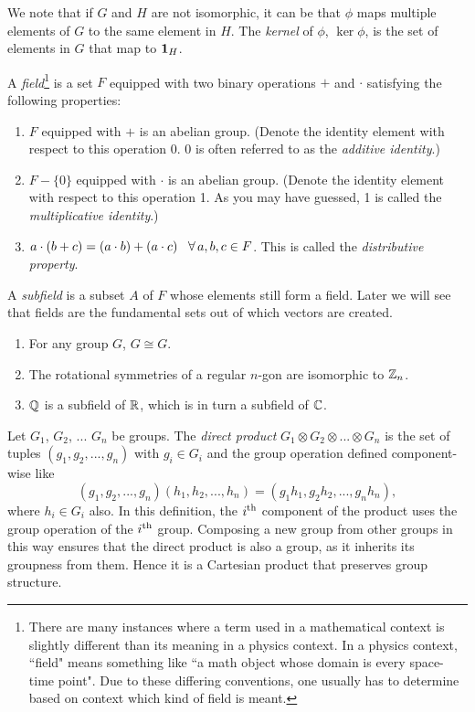 We note that if $G$ and $H$ are not isomorphic, it can be that $\phi$ maps
multiple elements of $G$ to the same element in $H$. The {\it
kernel} of $\phi$, $\ker\phi$, is the set of elements in $G$ that map
to ${\mathbf 1}_H$. 


A {\it field}\footnote{There are many instances where a term used in
a mathematical context is slightly different than its meaning in
a physics context. In a physics context, ``field" means something like
``a math object whose domain is every space-time point".
Due to these differing conventions, one usually has to determine based
on context which kind of field is meant.} 
is a set $F$ equipped with two binary
  operations  $+$ and $\cdot$  satisfying the following properties:
  \begin{enumerate}
    \item $F$ equipped with $+$ is an abelian group. (Denote the 
          identity element with respect to this operation 0. 0 is often 
          referred to as the {\it additive identity}.)
    \item $F-\{0\}$ equipped with $\cdot$ is an abelian group. (Denote the
          identity element with respect to this operation 1. As you may have
          guessed, 1 is called the 
          {\it multiplicative identity}.)
    \item $a\cdot (b+c)=(a\cdot b)+(a\cdot c)\ \ \Forall a,b,c\in F$. This is
          called the {\it distributive property}.
  \end{enumerate}
A {\it subfield} 
is a subset $A$ of $F$ whose elements still form a field.
Later we will see that fields are the fundamental sets out of
which vectors are created.

\begin{example*}{}{}
\begin{enumerate}
  \item For any group $G$, $G\cong G$.
  \item The rotational symmetries of a regular $n$-gon are isomorphic to
        $\mathbb{Z}_n$.
  \item $\mathbb{Q}$ is a subfield of $\mathbb{R}$, which is in turn a subfield of $\mathbb{C}$.
\end{enumerate}
\end{example*}

Let $G_1$, $G_2$, ... $G_n$ be groups. The
{\it direct product} 
$G_1\otimes G_2\otimes ...\otimes G_n$
is the set of tuples $(g_1,g_2,...,g_n)$ with $g_i\in G_i$
and the group operation defined component-wise like
\begin{equation}
(g_1,g_2,...,g_n)(h_1,h_2,...,h_n)
=(g_1h_1, g_2h_2,...,g_nh_n),
\end{equation}
where $h_i\in G_i$ also.
In this definition, the $i{}^{\rm th}$ component of the product
uses the group operation of the $i{}^{\rm th}$ group. Composing
a new group from other groups in this way ensures that
the direct product is also a group, as it inherits its
groupness from them. Hence it is a Cartesian product
that preserves group structure.

